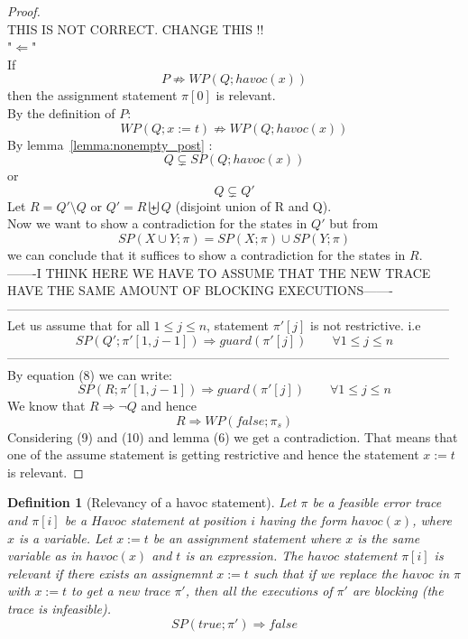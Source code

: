 \documentclass{article}
\newcommand{\limp}{\Rightarrow}
\newtheorem{mydef}{Definition}
\begin{document}
\begin{proof}
\begin{equation}
\end{equation}
THIS IS NOT CORRECT. CHANGE THIS !! \\
"$\Leftarrow$"\\
If 
$$P \not \limp WP(Q; havoc(x))$$
then the assignment statement $\pi[0]$ is relevant.\\
By the definition of $P$:
$$WP(Q; x:=t) \not \limp WP(Q; havoc(x))$$
By lemma~\ref{lemma:nonempty_post} :
$$Q \subsetneq SP(Q; havoc(x))$$
or
$$Q \subsetneq Q'$$
Let $R = Q'\setminus Q$ or $Q'=R \biguplus Q$ (disjoint union of R and Q).\\
Now we want to show a contradiction for the states in $Q'$ but from 
\begin{equation} 
SP(X \cup Y; \pi) = SP(X; \pi) \cup SP(Y;\pi)
\end{equation}
we can conclude that it suffices to show a contradiction for the states in $R$.\\
-------I THINK HERE WE HAVE TO ASSUME THAT THE NEW TRACE HAVE THE SAME AMOUNT OF BLOCKING EXECUTIONS-------\\
---------------------------------------------------------------------------------------------------------\\
Let us assume that for all $1 \leq j \leq n$, statement $\pi'[j]$ is not restrictive. i.e
$$SP(Q';\pi'[1,j-1]) \limp guard(\pi'[j]) \qquad \forall 1 \leq j \leq n$$
---------------------------------------------------------------------------------------------------------\\
By equation (8) we can write:
\begin{equation} 
SP(R; \pi'[1, j-1]) \limp guard(\pi'[j]) \qquad \forall 1 \leq j \leq n
\end{equation}
We know that $R \limp \neg Q$ and hence
\begin{equation} 
R \limp WP(false; \pi_s)
\end{equation}
Considering (9) and (10) and lemma (6) we get a contradiction.
That means that one of the assume statement is getting restrictive and hence the statement $x:=t$ is relevant.
\end{proof}

\begin{mydef}[Relevancy of a havoc statement]
Let $\pi$ be a feasible error trace and $\pi[i]$ be a $Havoc$ statement at position $i$ having the form $havoc(x)$, where $x$ is a variable. Let $x:=t$ be an assignment statement where $x$ is the same variable as in $havoc(x)$ and $t$ is an expression. The $havoc$ statement $\pi[i]$ is relevant if there exists an assignemnt $x:=t$ such that if we replace the $havoc$ in $\pi$ with $x:=t$ to get a new trace $\pi'$, then all the executions of $\pi'$ are blocking (the trace is infeasible).
$$SP(true; \pi') \Rightarrow false$$
\end{mydef}
\end{document}

